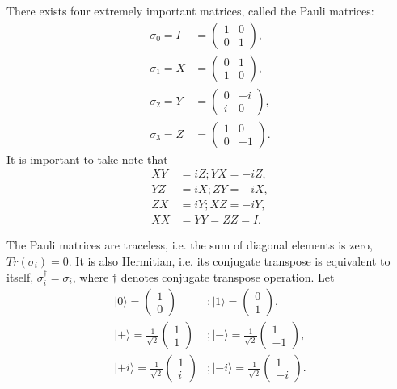 \documentclass{beamer}
\begin{document}
\begin{frame}
\justify
There exists four extremely important matrices, called the Pauli matrices:
\begin{align}
\sigma_0 = I & = \begin{pmatrix} 1 & 0 \\ 0 & 1 \end{pmatrix}, \\
\sigma_1 = X & = \begin{pmatrix} 0 & 1 \\ 1 & 0 \end{pmatrix}, \\
\sigma_2 = Y & = \begin{pmatrix} 0 & -i \\ i & 0 \end{pmatrix}, \\
\sigma_3 = Z & = \begin{pmatrix} 1 & 0 \\ 0 & -1 \end{pmatrix}.
\end{align}
\vfill
It is important to take note that
\begin{align}
XY & = iZ; YX = -iZ, \\
YZ & = iX; ZY = -iX, \\
ZX & = iY; XZ = -iY, \\
XX & = YY = ZZ = I.
\end{align}
\end{frame}

\begin{frame}
\justify
The Pauli matrices are traceless, i.e. the sum of diagonal elements is zero, $Tr(\sigma_i)=0$.
\vfill
It is also Hermitian, i.e. its conjugate transpose is equivalent to itself, $\sigma_i^\dagger = \sigma_i$, where $\dagger$ denotes conjugate transpose operation.
\vfill
Let
\begin{align}
|0\rangle = \begin{pmatrix} 1 \\ 0 \end{pmatrix} &; |1\rangle = \begin{pmatrix} 0 \\ 1 \end{pmatrix}, \\
|+\rangle = \frac{1}{\sqrt{2}} \begin{pmatrix} 1 \\ 1 \end{pmatrix} &; |-\rangle = \frac{1}{\sqrt{2}} \begin{pmatrix} 1 \\ -1 \end{pmatrix}, \\
|+i\rangle = \frac{1}{\sqrt{2}} \begin{pmatrix} 1 \\ i \end{pmatrix} &; |-i\rangle = \frac{1}{\sqrt{2}} \begin{pmatrix} 1 \\ -i \end{pmatrix}.
\end{align}
\end{frame}
\end{document}

